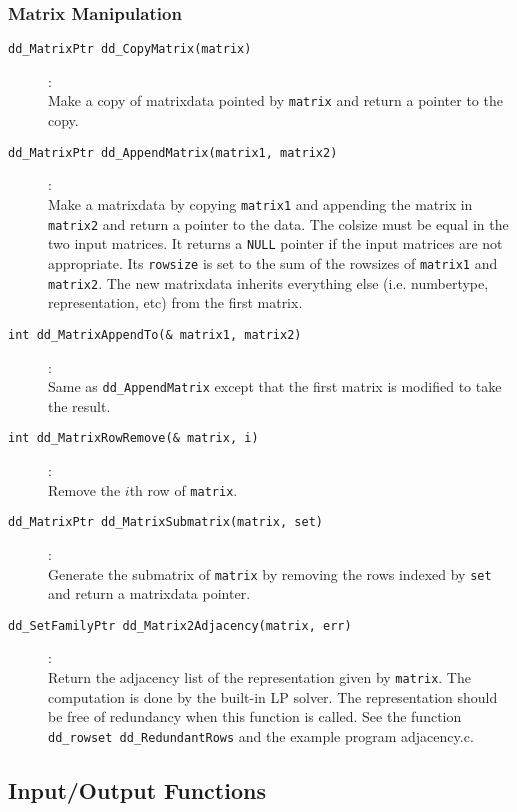 \documentclass[11pt]{article}
\newcommand {\0} {{\bf 0}}
\begin{document}
\subsubsection{Matrix Manipulation}
\begin{description}

\item[{\tt dd\_MatrixPtr dd\_CopyMatrix(matrix)}]:\\
Make a copy of matrixdata pointed by {\tt matrix} and return
a pointer to the copy.

\item[{\tt dd\_MatrixPtr dd\_AppendMatrix(matrix1, matrix2)}]:\\
Make a matrixdata by copying {\tt *matrix1} and appending
the matrix in {\tt *matrix2} and return
a pointer to the data.  The colsize must be equal in
the two input matrices.  It returns a {\tt NULL} pointer
if the input matrices are not appropriate.
Its {\tt rowsize} is set to
the sum of the rowsizes of {\tt matrix1} and {\tt matrix2}.
 The new matrixdata inherits everything else
(i.e. numbertype, representation, etc)
from the first matrix.

\item[{\tt int dd\_MatrixAppendTo(\& matrix1, matrix2)}]:\\
Same as {\tt dd\_AppendMatrix} except that the first matrix
is modified to take the result.

\item[{\tt int dd\_MatrixRowRemove(\& matrix, i)}]:\\
Remove the $i$th row of {\tt matrix}.

\item[{\tt dd\_MatrixPtr dd\_MatrixSubmatrix(matrix, set)}]:\\
Generate the submatrix of {\tt matrix} by removing the
rows indexed by {\tt set} and return a matrixdata pointer.

\item[{\tt  dd\_SetFamilyPtr dd\_Matrix2Adjacency(matrix, err)}]:\\
Return the adjacency list of the representation given by {\tt matrix}.
The computation is done by the built-in LP solver.  The representation
should be free of redundancy when this function is called.
See the function  {\tt dd\_rowset dd\_RedundantRows}
and the example program adjacency.c.

\end{description}

\subsection{Input/Output Functions}  \label{IOLibrary}
\end{document}
